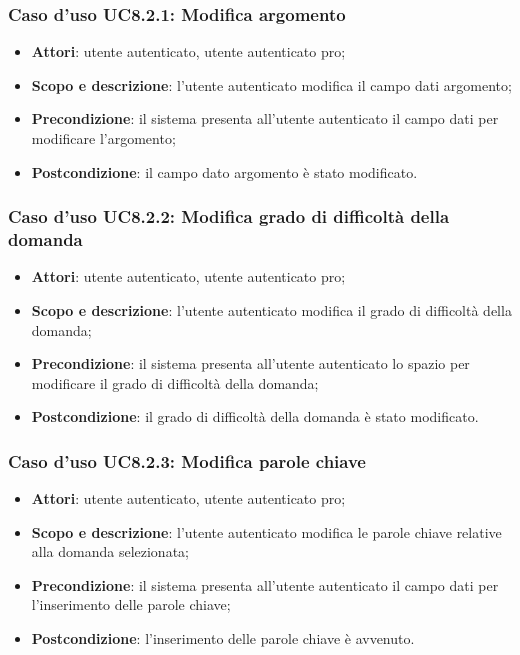 	\subsubsection{Caso d'uso UC8.2.1: Modifica argomento}
	\begin{itemize}
		\item
			\textbf{Attori}: utente autenticato, utente autenticato pro;
		\item
			\textbf{Scopo e descrizione}: l'utente autenticato modifica il campo dati argomento;
		\item		
			\textbf{Precondizione}: il sistema presenta all'utente autenticato il campo dati per modificare l'argomento;
		\item
			\textbf{Postcondizione}: il campo dato argomento è stato modificato.
	\end{itemize}	
	\subsubsection{Caso d'uso UC8.2.2: Modifica grado di difficoltà della domanda}
	\begin{itemize}
		\item
			\textbf{Attori}: utente autenticato, utente autenticato pro;
		\item
			\textbf{Scopo e descrizione}: l'utente autenticato modifica il grado di difficoltà della domanda;
		\item		
			\textbf{Precondizione}: il sistema presenta all'utente autenticato lo spazio per modificare il grado di difficoltà della domanda;
		\item
			\textbf{Postcondizione}: il grado di difficoltà della domanda è stato modificato.
	\end{itemize}	
	\subsubsection{Caso d'uso UC8.2.3: Modifica parole chiave}
	\begin{itemize}
		\item
			\textbf{Attori}: utente autenticato, utente autenticato pro;
		\item
			\textbf{Scopo e descrizione}: l'utente autenticato modifica le parole chiave relative alla domanda selezionata;
		\item		
			\textbf{Precondizione}: il sistema presenta all'utente autenticato il campo dati per l'inserimento delle parole chiave;
		\item
			\textbf{Postcondizione}: l'inserimento delle parole chiave è avvenuto.
	\end{itemize}
